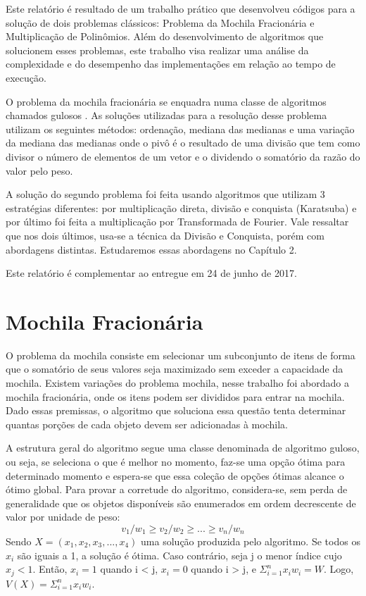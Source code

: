 \documentclass[
	12pt,				%
	oneside,			%
	a4paper,			%
	english,			%
	french,				%
	spanish,			%
	brazil,				%
	]{abntex2}
\begin{document}
Este relatório é resultado de um trabalho prático que desenvolveu códigos para a solução de dois problemas clássicos: Problema da Mochila Fracionária e Multiplicação de Polinômios. Além do desenvolvimento de algoritmos que solucionem esses problemas, este trabalho visa realizar uma análise da complexidade e do desempenho das implementações em relação ao tempo de execução.

O problema da mochila fracionária se enquadra numa classe de algoritmos chamados gulosos \cite{manber1989}. As soluções utilizadas para a resolução desse problema utilizam os seguintes métodos: ordenação, mediana das medianas e uma variação da mediana das medianas onde o pivô é o resultado de uma divisão que tem como divisor o número de elementos de um vetor e o dividendo o somatório da razão do valor pelo peso.

A solução do segundo problema foi feita usando algoritmos que utilizam 3 estratégias diferentes: por multiplicação direta, divisão e conquista (Karatsuba) e por último foi feita a multiplicação por Transformada de Fourier. Vale ressaltar que nos dois últimos, usa-se a técnica da Divisão e Conquista, porém com abordagens distintas. Estudaremos essas abordagens no Capítulo 2.

Este relatório é complementar ao entregue em 24 de junho de 2017. 


\chapter[Mochila Fracionária]{Mochila Fracionária}

O problema da mochila consiste em selecionar um subconjunto de itens de forma que o somatório de seus valores seja maximizado sem exceder a capacidade da mochila. Existem variações do problema mochila, nesse trabalho foi abordado a mochila fracionária, onde os itens podem ser divididos para entrar na mochila. Dado essas premissas, o algoritmo que soluciona essa questão tenta determinar quantas porções de cada objeto devem ser adicionadas à mochila. 

A estrutura geral do algoritmo segue uma classe denominada de algoritmo guloso, ou seja, se seleciona o que é melhor no momento, faz-se uma opção ótima para determinado momento e espera-se que essa coleção de opções ótimas alcance o ótimo global. Para provar a corretude do algoritmo, considera-se, sem perda de generalidade que os objetos disponíveis são enumerados em ordem decrescente de valor por unidade de peso:
\[ v_1/w_1 \geq v_2/w_2 \geq ... \geq v_n/w_n \]
Sendo \( X = (x_1, x_2, x_3, ..., x_4) \) uma solução produzida pelo algoritmo. Se todos os \(x_i\) são iguais a 1, a solução é ótima. Caso contrário, seja j o menor índice cujo \(x_j < 1\). Então, \(x_i = 1\) quando i < j, \(x_i = 0\)  quando i > j, e \( \Sigma_{i=1}^nx_iw_i = W\). Logo, \( V(X) = \Sigma_{i=1}^nx_iw_i\).
\end{document}

